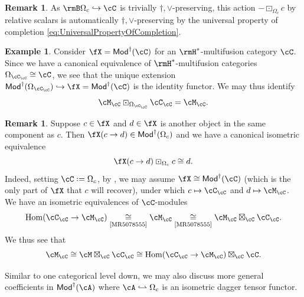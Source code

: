\documentclass[12pt, reqno]{amsart}
\DeclareMathOperator{\Hom}{Hom}
\newcommand{\isometry}{\mathrel{\,\joinrel\lhook\joinrel\rightharpoonup}}
\newcommand{\Mod}{\mathsf{Mod}}
\theoremstyle{plain}
\theoremstyle{definition}
\newtheorem{ex}[thm]{Example}
\newtheorem{rem}[thm]{Remark}
\newcommand{\coloneq}{:=}
\def\coloneq{\mathrel{\vcenter{\baselineskip0.55ex\lineskiplimit0pt\hbox{\upshape.}\hbox{\upshape.}}}=}
\begin{document}
\begin{rem}\label{rem:RelativeScalarActionIsDagVeePreserving}
As $\rmB \Omega_c \hookrightarrow \cC$ is trivially $\dag,\vee$-preserving, this action $- \boxdot_{\Omega_c} c$ by relative scalars is automatically $\dag,\vee$-preserving by the universal property of completion
\eqref{eq:UniversalPropertyOfCompletion}. 
\end{rem}

\begin{ex}
Consider $\fX=\Mod^\dag(\cC)$ for an $\rmH^*$-multifusion category $\cC$.
Since we have a canonical equivalence of $\rmH^*$-multifusion categories $\Omega_{\cC_\cC}\cong \cC$,
we see that the unique extension
$\Mod^\dag(\Omega_{\cC_\cC}) \hookrightarrow \fX=\Mod^\dag(\cC)$ is the identity functor.
We may thus identify 
$$
\cM_\cC\boxdot_{\Omega_{\cC_\cC}} \cC_\cC = 
\cM_\cC.
$$
\end{ex}

\begin{rem}
Suppose $c\in\fX$ and $d\in \fX$ is another object in the same component as $c$.
Then $\fX(c\to d)\in \Mod^\dag(\Omega_c)$
and
we have a canonical isometric equivalence 
\begin{equation}
\label{eq:ExpressInBasis}    
\fX(c\to d) \boxdot_{\Omega_c} c \cong d.
\end{equation}
Indeed, setting $\cC\coloneq\Omega_c$,
by \cite[Cor.~4.52]{MR5078555},
we may assume $\fX\cong \Mod^\dag(\cC)$
(which is the only part of $\fX$ that $c$ will recover), under which $c\mapsto \cC_\cC$
and $d\mapsto \cM_\cC$.
We have an isometric equivalences of $\cC$-modules
$$
\Hom(\cC_\cC \to \cM_{\cC}) 
\underset{\text{\cite[Prop.~3.9]{MR5078555}}}{\cong} 
\cM_{\cC}
\underset{\text{\cite[Cor.~3.12]{MR5078555}}}{\cong} 
\cM_\cC \boxtimes_\cC \cC_\cC.
$$
We thus see that 
$$
\cM_\cC
\cong
\cM \boxtimes_\cC \cC_\cC 
\cong 
\Hom(\cC_\cC \to \cM_\cC) \boxtimes_\cC \cC.
$$
\end{rem}

Similar to \cite[Eq.~(11)]{2411.01678} one categorical level down, we may also discuss more general coefficients in $\Mod^\dag(\cA)$ where $\cA\isometry \Omega_c$ is an isometric dagger tensor functor.
\end{document}
